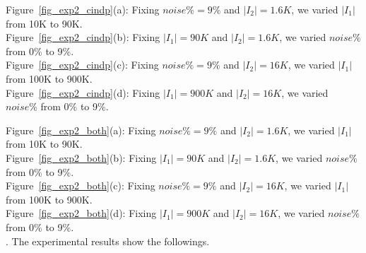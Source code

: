 \begin{figure*}
  \centering
  \centering
  \quad
  \quad
  \quad
  \caption{Effectiveness of detecting \pCIND violations}\label{fig_exp2_cindp}
\end{figure*}

\noindent Figure~\ref{fig_exp2_cindp}(a): Fixing $noise\% = 9\%$ and $|I_2| = 1.6K$, we varied $|I_1|$ from 10K to 90K.\\
Figure~\ref{fig_exp2_cindp}(b): Fixing $|I_1| = 90K$ and $|I_2| = 1.6K$, we varied $noise\%$ from 0\% to 9\%.\\
Figure~\ref{fig_exp2_cindp}(c): Fixing $noise\% = 9\%$ and $|I_2| = 16K$, we varied $|I_1|$ from 100K to 900K.\\
Figure~\ref{fig_exp2_cindp}(d): Fixing $|I_1| = 900K$ and $|I_2| = 16K$, we varied $noise\%$ from 0\% to 9\%.\\



\begin{figure*}
  \centering
  \quad
  \quad
  \quad
  \caption{Effectiveness of detecting \pCFD and \pCIND violations}\label{fig_exp2_both}
\end{figure*}

\noindent Figure~\ref{fig_exp2_both}(a): Fixing $noise\% = 9\%$ and $|I_2| = 1.6K$, we varied $|I_1|$ from 10K to 90K.\\
Figure~\ref{fig_exp2_both}(b): Fixing $|I_1| = 90K$ and $|I_2| = 1.6K$, we varied $noise\%$ from 0\% to 9\%.\\
Figure~\ref{fig_exp2_both}(c): Fixing $noise\% = 9\%$ and $|I_2| = 16K$, we varied $|I_1|$ from 100K to 900K.\\
Figure~\ref{fig_exp2_both}(d): Fixing $|I_1| = 900K$ and $|I_2| = 16K$, we varied $noise\%$ from 0\% to 9\%.\\



. The experimental results show the followings.








